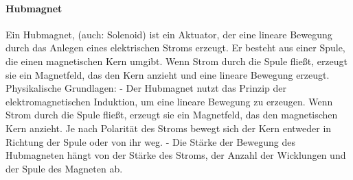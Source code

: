 \paragraph{Hubmagnet}
Ein Hubmagnet, (auch: Solenoid) ist ein Aktuator, der eine lineare Bewegung durch das Anlegen eines elektrischen
Stroms erzeugt. Er besteht aus einer Spule, die einen magnetischen Kern umgibt. Wenn Strom durch die Spule fließt, erzeugt
sie ein Magnetfeld, das den Kern anzieht und eine lineare Bewegung erzeugt.\newline
Physikalische Grundlagen:\newline
- Der Hubmagnet nutzt das Prinzip der elektromagnetischen Induktion, um eine lineare Bewegung zu erzeugen. Wenn Strom
durch die Spule fließt, erzeugt sie ein Magnetfeld, das den magnetischen Kern anzieht. Je nach Polarität des Stroms bewegt
sich der Kern entweder in Richtung der Spule oder von ihr weg. \newline
- Die Stärke der Bewegung des Hubmagneten hängt von der Stärke des Stroms, der Anzahl der Wicklungen und der
Spule des Magneten ab.

